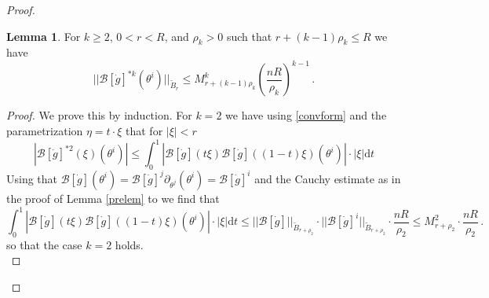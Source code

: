 \documentclass{article}
\theoremstyle{definition}
\newtheorem{lemma}[theorem]{Lemma}
\numberwithin{equation}{section}
\begin{document}
\begin{proof}
    \begin{lemma}
        For $k\geq 2$, $0<r<R$, and $\rho_k>0$ such that $r+(k-1)\rho_k\leq R$ we have  
        \begin{equation}\label{est1}
            ||\mathcal{B}[\dot{g}]^{*k}(\theta^i)||_{\widetilde{B}_{r}}\leq M_{r+(k-1)\rho_k}^k \left(\frac{nR}{\rho_k}\right)^{k-1}\,.
        \end{equation}
    \end{lemma}
    \begin{proof}
        We prove this by induction. For $k=2$ we have using \eqref{convform} and the parametrization $\eta=t\cdot \xi$ that for $|\xi|<r$
        \begin{equation*}
            |\mathcal{B}[\dot{g}]^{*2}(\xi)(\theta^i)|\leq \int_0^1|\mathcal{B}[\dot{g}](t\xi)\mathcal{B}[\dot{g}]((1-t)\xi)(\theta^i)|\cdot |\xi|\mathrm{d}t
        \end{equation*}
    Using that $\mathcal{B}[\dot{g}](\theta^i)=\mathcal{B}[\dot{g}]^{j}\partial_{\theta^{j}}(\theta^i)=\mathcal{B}[\dot{g}]^i$ and the Cauchy estimate as in the proof of Lemma \ref{prelem} to we find that 
    \begin{equation*}
        \int_0^1|\mathcal{B}[\dot{g}](t\xi)\mathcal{B}[\dot{g}]((1-t)\xi)(\theta^i)|\cdot |\xi|\mathrm{d}t\leq ||\mathcal{B}[\dot{g}]||_{\widetilde{B}_{r+\rho_2}}\cdot||\mathcal{B}[\dot{g}]^i||_{\widetilde{B}_{r+\rho_2}}\cdot \frac{nR}{\rho_2}\leq M_{r+\rho_2}^2\cdot \frac{nR}{\rho_2}\,.
    \end{equation*}
    so that the case $k=2$ holds. \\


\end{proof}
\end{proof}
\end{document}
